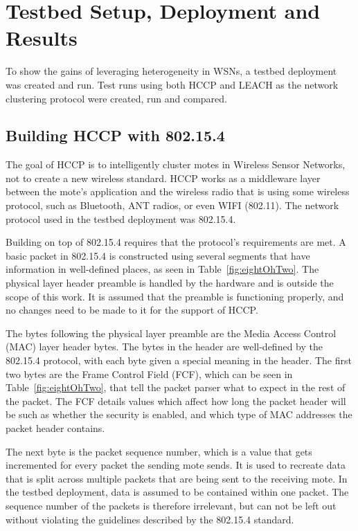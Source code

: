 \section{Testbed Setup, Deployment and Results}
\label{ch:Physical Network}

To show the gains of leveraging heterogeneity in WSNs, a testbed deployment was created and run. Test runs
using both HCCP and LEACH as the network clustering protocol were created, run and compared. 

\subsection{Building HCCP with 802.15.4}


The goal of HCCP is to intelligently cluster motes in Wireless Sensor Networks, not to 
create a new wireless standard. HCCP works as a middleware layer between the 
mote's application and the wireless radio that is using some wireless protocol, 
such as Bluetooth, ANT radios, or even WIFI (802.11). The
network protocol used in the testbed deployment was 802.15.4.

Building on top of 802.15.4 requires that the protocol's requirements are met. 
A basic packet in 802.15.4 is constructed using several segments that
have information in well-defined places, as seen in Table~\ref{fig:eightOhTwo}.
The physical layer header preamble is handled by the hardware and is outside the scope
of this work. It is assumed that the preamble is functioning properly, and no changes need to be made
to it for the support of HCCP.

The bytes following the physical layer preamble are the Media Access Control (MAC) layer
header bytes. The bytes in the header are well-defined by the 802.15.4 protocol,
with each byte given a special meaning in the header.  
The first two bytes are the Frame Control Field (FCF), which can be seen in Table~\ref{fig:eightOhTwo},
that tell the packet parser
what to expect in the rest of the packet. The FCF details values which affect
how long the packet header will be such as whether
the security is enabled, and which type of MAC addresses the packet header
contains. 

The next byte is the packet sequence number, which is a value that gets incremented for
every packet the sending mote sends. It is used to recreate data that is split across multiple packets
that are being sent to the receiving mote. In the testbed deployment, data is assumed to be 
contained within one packet. The sequence number of the packets is therefore irrelevant, but can not be
left out without violating the guidelines described by the 802.15.4 standard.


